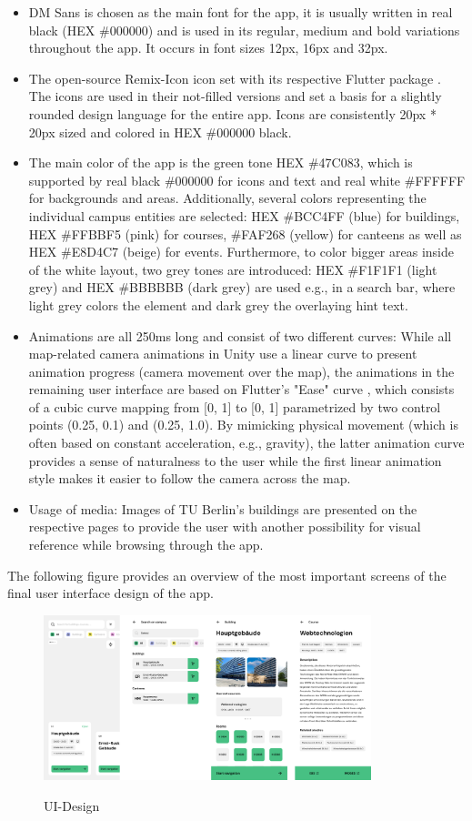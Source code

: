 \begin{itemize}
    \item DM Sans \cite{dm_sans} is chosen as the main font for the app, it is usually written in real black (HEX \#000000) and is used in its regular, medium and bold variations throughout the app. It occurs in font sizes 12px, 16px and 32px.
    \item The open-source Remix-Icon \cite{remix_icons} icon set with its respective Flutter package \cite{remix_icons_flutter}. The icons are used in their not-filled versions and set a basis for a slightly rounded design language for the entire app. Icons are consistently 20px * 20px sized and colored in HEX \#000000 black.
    \item The main color of the app is the green tone HEX \#47C083, which is supported by real black \#000000 for icons and text and real white \#FFFFFF for backgrounds and areas. Additionally, several colors representing the individual campus entities are selected: HEX \#BCC4FF (blue) for buildings, HEX \#FFBBF5 (pink) for courses, \#FAF268 (yellow) for canteens as well as HEX \#E8D4C7 (beige) for events. Furthermore, to color bigger areas inside of the white layout, two grey tones are introduced: HEX \#F1F1F1 (light grey) and HEX \#BBBBBB (dark grey) are used e.g., in a search bar, where light grey colors the element and dark grey the overlaying hint text.
    \item Animations are all 250ms long and consist of two different curves: While all map-related camera animations in Unity use a linear curve to present animation progress (camera movement over the map), the animations in the remaining user interface are based on Flutter's "Ease" curve \cite{ease_curve}, which consists of a cubic curve mapping from [0, 1] to [0, 1] parametrized by two control points (0.25, 0.1) and (0.25, 1.0). By mimicking physical movement (which is often based on constant acceleration, e.g., gravity), the latter animation curve provides a sense of naturalness to the user while the first linear animation style makes it easier to follow the camera across the map.
    \item Usage of media: Images of TU Berlin's buildings are presented on the respective pages to provide the user with another possibility for visual reference while browsing through the app.
\end{itemize}

The following figure provides an overview of the most important screens of the final user interface design of the app.

\begin{figure}[H]
	\centering
	\includegraphics[width=0.85\textwidth]{images/ui_design.png}\\
	\caption{UI-Design}
\end{figure}